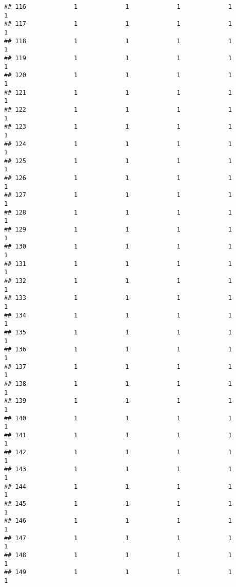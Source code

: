 \documentclass[
]{article}
\begin{document}
\begin{verbatim}
## 116             1             1             1             1             1
## 117             1             1             1             1             1
## 118             1             1             1             1             1
## 119             1             1             1             1             1
## 120             1             1             1             1             1
## 121             1             1             1             1             1
## 122             1             1             1             1             1
## 123             1             1             1             1             1
## 124             1             1             1             1             1
## 125             1             1             1             1             1
## 126             1             1             1             1             1
## 127             1             1             1             1             1
## 128             1             1             1             1             1
## 129             1             1             1             1             1
## 130             1             1             1             1             1
## 131             1             1             1             1             1
## 132             1             1             1             1             1
## 133             1             1             1             1             1
## 134             1             1             1             1             1
## 135             1             1             1             1             1
## 136             1             1             1             1             1
## 137             1             1             1             1             1
## 138             1             1             1             1             1
## 139             1             1             1             1             1
## 140             1             1             1             1             1
## 141             1             1             1             1             1
## 142             1             1             1             1             1
## 143             1             1             1             1             1
## 144             1             1             1             1             1
## 145             1             1             1             1             1
## 146             1             1             1             1             1
## 147             1             1             1             1             1
## 148             1             1             1             1             1
## 149             1             1             1             1             1

\end{verbatim}
\end{document}
